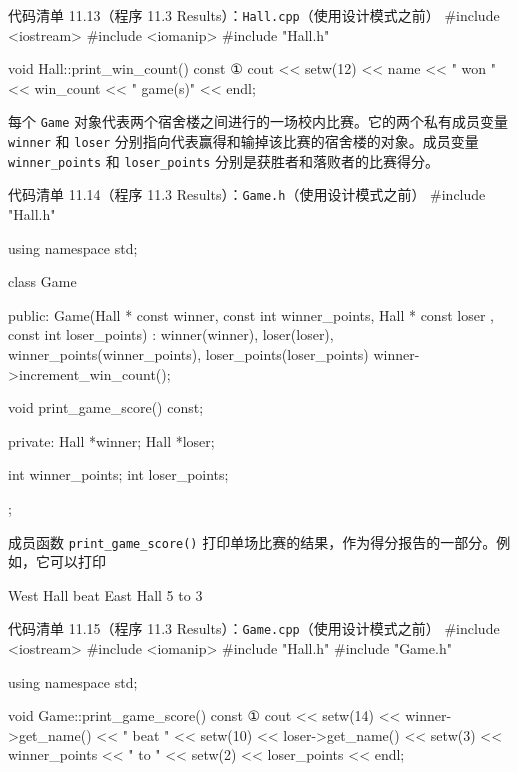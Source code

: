 \begin{codeboxt}{代码清单 11.13（程序 11.3 Results）：\texttt{Hall.cpp}（使用设计模式之前）}
#include <iostream>
#include <iomanip>
#include "Hall.h"

void Hall::print_win_count() const       ①
{
    cout << setw(12) << name << " won "
         << win_count << " game(s)" << endl;
}
\end{codeboxt}
\par

每个 \texttt{Game} 对象代表两个宿舍楼之间进行的一场校内比赛。它的两个私有成员变量 \texttt{winner} 和 \texttt{loser} 分别指向代表赢得和输掉该比赛的宿舍楼的对象。成员变量 \texttt{winner\_\allowbreak{}points} 和 \texttt{loser\_\allowbreak{}points} 分别是获胜者和落败者的比赛得分。

\begin{codeboxt}{代码清单 11.14（程序 11.3 Results）：\texttt{Game.h}（使用设计模式之前）}
#include "Hall.h"

using namespace std;

class Game
{
public:
    Game(Hall * const winner, const int winner_points,
         Hall * const loser , const int loser_points)
        : winner(winner), loser(loser),
          winner_points(winner_points),
          loser_points(loser_points)
    {
        winner->increment_win_count();
    }

    void print_game_score() const;

private:
    Hall *winner;
    Hall *loser;

    int winner_points;
    int loser_points;
};
\end{codeboxt}

成员函数 \texttt{print\_\allowbreak{}game\_\allowbreak{}score(\allowbreak{})\allowbreak{}} 打印单场比赛的结果，作为得分报告的一部分。例如，它可以打印

\begin{codebox}
West Hall beat East Hall 5 to 3
\end{codebox}

\begin{codeboxt}{代码清单 11.15（程序 11.3 Results）：\texttt{Game.cpp}（使用设计模式之前）}
#include <iostream>
#include <iomanip>
#include "Hall.h"
#include "Game.h"

using namespace std;

void Game::print_game_score() const       ①
{
    cout << setw(14) << winner->get_name() << " beat "
         << setw(10) << loser->get_name()
         << setw(3)  << winner_points
         << " to "   << setw(2) << loser_points << endl;
}
\end{codeboxt}
\par


